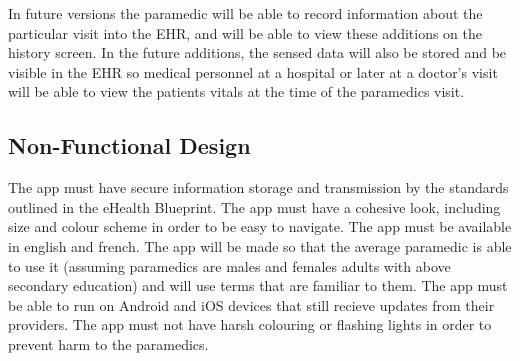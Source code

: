 In future versions the paramedic will be able to record information about the particular visit into the EHR, and will be able to view these additions on the history screen. In the future additions, the sensed data will also be stored and be visible in the EHR so medical personnel at a hospital or later at a doctor's visit will be able to view the patients vitals at the time of the paramedics visit.



\fi







\subsection{Non-Functional Design}
The app must have secure information storage and transmission by the standards outlined in the eHealth Blueprint. The app must have a cohesive look, including size and colour scheme in order to be easy to navigate. The app must be available in english and french. The app will be made so that the average paramedic is able to use it (assuming paramedics are males and females adults with above secondary education) and will use terms that are familiar to them.
The app must be able to run on Android and iOS devices that still recieve updates from their providers. The app must not have harsh colouring or flashing lights in order to prevent harm to the paramedics.
